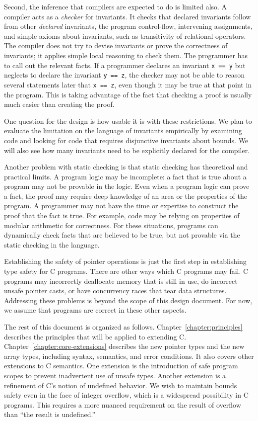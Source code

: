 Second, the inference that compilers are expected to do is limited also.
A compiler acts as a \emph{checker} for invariants. It checks that
declared invariants follow from other \emph{declared} invariants, the
program control-flow, intervening assignments, and simple axioms about
invariants, such as transitivity of relational operators. The compiler
does not try to devise invariants or prove the correctness of
invariants; it applies simple local reasoning to check them. The
programmer has to call out the relevant facts. If a programmer declares
an invariant \texttt{x == y} but neglects to declare the invariant
\texttt{y == z}, the checker may not be able to reason several
statements later that \texttt{x == z}, even though it may be true at
that point in the program. This is taking advantage of the fact that
checking a proof is usually much easier than creating the proof.

One question for the design is how usable it is with these restrictions.
We plan to evaluate the limitation on the language of invariants
empirically by examining code and looking for code that requires
disjunctive invariants about bounds. We will also see how many
invariants need to be explicitly declared for the compiler.

Another problem with static checking is that static checking has
theoretical and practical limits. A program logic may be incomplete: a
fact that is true about a program may not be provable in the logic. Even
when a program logic can prove a fact, the proof may require deep
knowledge of an area or the properties of the program. A programmer may
not have the time or expertise to construct the proof that the fact is
true. For example, code may be relying on properties of modular
arithmetic for correctness. For these situations, programs can
dynamically check facts that are believed to be true, but not provable
via the static checking in the language.

Establishing the safety of pointer operations is just the first step in
establishing type safety for C programs. There are other ways which C
programs may fail. C programs may incorrectly deallocate memory that is
still in use, do incorrect unsafe pointer casts, or have concurrency
races that tear data structures. Addressing these problems is beyond the
scope of this design document. For now, we assume that programs are
correct in these other aspects.

The rest of this document is organized as follows. Chapter~\ref{chapter:principles}
describes the principles that will be applied to extending C.  
Chapter~\ref{chapter:core-extensions} describes
the new pointer types and the new array types, including syntax,
semantics, and error conditions. It also covers other extensions to C
semantics. One extension is the introduction of safe program scopes to
prevent inadvertent use of unsafe types. Another extension is a
refinement of C's notion of undefined behavior. We wish to maintain
bounds safety even in the face of integer overflow, which is a
widespread possibility in C programs. This requires a more nuanced
requirement on the result of overflow than ``the result is undefined.''

